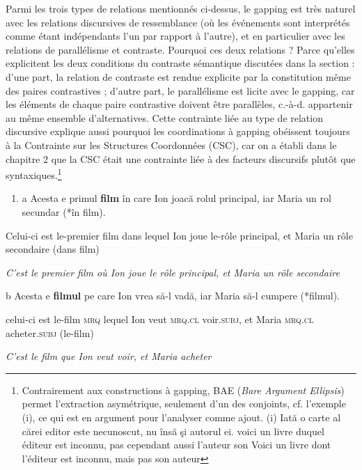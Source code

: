 Parmi les trois types de relations mentionnés ci-dessus, le gapping est très naturel avec les relations discursives de ressemblance (où les événements sont interprétés comme étant indépendants l'un par rapport à l'autre), et en particulier avec les relations de parallélisme et contraste. Pourquoi ces deux relations ? Parce qu'elles explicitent les deux conditions du contraste sémantique discutées dans la section  : d'une part, la relation de contraste est rendue explicite par la constitution même des paires contrastives ; d'autre part, le parallélisme est licite avec le gapping, car les éléments de chaque paire contrastive doivent être parallèles, c.-à-d. appartenir au même ensemble d'alternatives. Cette contrainte liée au type de relation discursive explique aussi pourquoi les coordinations à gapping obéissent toujours à la Contrainte sur les Structures Coordonnées (CSC), car on a établi dans le chapitre 2 que la CSC était une contrainte liée à des facteurs discursifs plutôt que syntaxiques.\footnote{Contrairement aux constructions à gapping, BAE (\textit{Bare Argument Ellipsis}) permet l'extraction asymétrique, seulement d'un des conjoints, cf. l'exemple (i), ce qui est en argument pour l'analyser comme ajout.
(i)  Iată o carte al cărei editor este necunoscut, nu însă şi autorul ei.
voici un livre duquel éditeur est inconnu, pas cependant aussi l'auteur son
Voici un livre dont l'éditeur est inconnu, mais pas son auteur} 


\begin{enumerate}
\item a  Acesta e primul \textbf{film} în care Ion joacă rolul principal, iar Maria un rol secundar (*în film).


\end{enumerate}
Celui-ci est le-premier film dans lequel Ion joue le-rôle principal, et Maria un rôle secondaire (dans film)

{\itshape
C'est le premier film où Ion joue le rôle principal, et Maria un rôle secondaire } 

  b  Acesta e \textbf{filmul} pe care Ion vrea să-l vadă, iar Maria să-l cumpere (*filmul). 

celui-ci est le-film \textsc{mrq} lequel Ion veut \textsc{mrq.cl} voir\textsc{.subj,} et Maria \textsc{mrq.cl} acheter\textsc{.subj} (le-film)

    \textit{C'est le film que Ion veut voir, et Maria acheter } 

